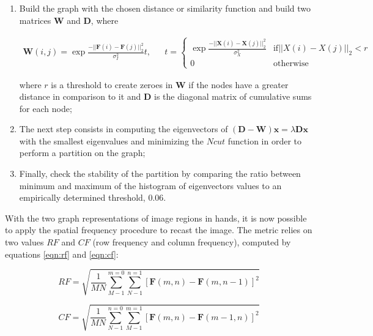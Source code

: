\begin{enumerate}[label=\Roman*.]
    \item Build the graph with the chosen distance or similarity function and build two matrices $\mathbf{W}$ and $\mathbf{D}$, where
    
    \begin{align*}
        \mathbf{W}(i,j) = 
        \exp{\frac{-||\mathbf{F}(i)-\mathbf{F}(j)||_{2}^{2}}{\sigma_{I}^{2}}} t,
        &&
        t = 
        \begin{cases}
            \exp{\frac{-||\mathbf{X}(i)-\mathbf{X}(j)||_{2}^{2}}{\sigma_{X}^{2}}} & \text{if}
            ||X(i)-X(j)||_{2} < r
            \\0 & \text{otherwise}
        \end{cases}
    \end{align*}
    
    where $r$ is a threshold to create zeroes in $\mathbf{W}$ if the nodes have a greater distance in comparison to it and $\mathbf{D}$ is the diagonal matrix of cumulative sums for each node;
    
    \item The next step consists in computing the eigenvectors of $(\mathbf{D} - \mathbf{W})\mathbf{x} = \lambda\mathbf{D}\mathbf{x}$ with the smallest eigenvalues and minimizing the $Ncut$ function in order to perform a partition on the graph;
    
    \item Finally, check the stability of the partition by comparing the ratio between minimum and maximum of the histogram of eigenvectors values to an empirically determined threshold, $0.06$.
\end{enumerate}

With the two graph representations of image regions in hands, it is now possible to apply the spatial frequency procedure to recast the image. The metric relies on two values $RF$ and $CF$ (row frequency and column frequency), computed by equations \ref{eqn:rf} and \ref{eqn:cf}:

\begin{equation}
\label{eqn:rf}
    RF = \sqrt{\frac{1}{MN}
    \sum_{M-1}^{m=0}
    \sum_{N-1}^{n=1}
    [\mathbf{F}(m,n) - \mathbf{F}(m,n-1)]^{2}}
\end{equation}

\begin{equation}
\label{eqn:cf}
    CF = \sqrt{\frac{1}{MN}
    \sum_{N-1}^{n=0}
    \sum_{M-1}^{m=1}
    [\mathbf{F}(m,n) - \mathbf{F}(m-1,n)]^{2}}
\end{equation}

